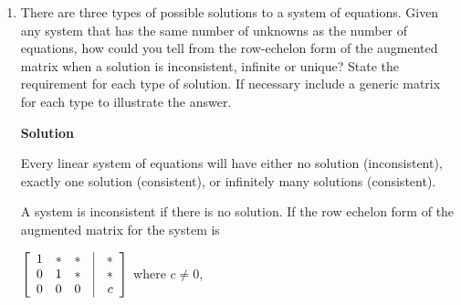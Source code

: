 \begin{enumerate}
\item There are three types of possible solutions to a system of
equations. Given any system that has the same number of unknowns
as the number of equations, how could you tell from the row-echelon form of the augmented
matrix when a solution is
inconsistent, infinite or unique? State the requirement for each
type of solution. If necessary include a generic matrix for each
type to illustrate the answer.

\noindent \textbf{Solution}

\noindent Every linear system of equations will have either no
solution (inconsistent), exactly one solution (consistent), or
infinitely many solutions (consistent).

\noindent A system is inconsistent if there is no solution. If the
row echelon form of the augmented matrix for the system is

$ \left[\begin{array}{rrrcr}
                    1&*&*&\vline&*\\
                    0&1&*&\vline&*\\
                    0&0&0&\vline&c\end{array}\right]$ where
                    $c\neq0$,


\end{enumerate}
